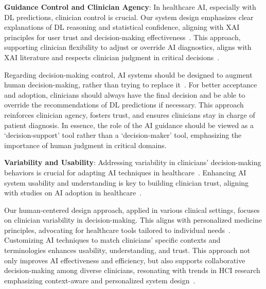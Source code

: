 
\noindent
\textcolor{revised}{{\bf Guidance Control and Clinician Agency}:
In healthcare \ac{AI}, especially with \ac{DL} predictions, clinician control is crucial.
Our system design emphasizes clear explanations of \ac{DL} reasoning and statistical confidence, aligning with \ac{XAI} principles for user trust and decision-making effectiveness~\cite{EVANS2022281}.
This approach, supporting clinician flexibility to adjust or override \ac{AI} diagnostics, aligns with \ac{XAI} literature and respects clinician judgment in critical decisions~\cite{10.1145/3313831.3376290}.}

\vspace{2.00mm}

\textcolor{revised}{Regarding decision-making control, \ac{AI} systems should be designed to augment human decision-making, rather than trying to replace it~\cite{SchaekermannMike2020, 10.1145/3308560.3317085}.
For better acceptance and adoption, clinicians should always have the final decision and be able to override the recommendations of \ac{DL} predictions if necessary.
This approach reinforces clinician agency, fosters trust, and ensures clinicians stay in charge of patient diagnosis.
In essence, the role of the \ac{AI} guidance should be viewed as a `decision-support' tool rather than a `decision-maker' tool, emphasizing the importance of human judgment in critical domains.}

\vspace{2.00mm}

\noindent
\textcolor{revised}{{\bf Variability and Usability}:
Addressing variability in clinicians' decision-making behaviors is crucial for adapting \ac{AI} techniques in healthcare~\cite{GIBSON2018113}.
Enhancing \ac{AI} system usability and understanding is key to building clinician trust, aligning with studies on \ac{AI} adoption in healthcare~\cite{Topol2019}.}

\vspace{2.00mm}

\textcolor{revised}{Our human-centered design approach, applied in various clinical settings, focuses on clinician variability in decision-making.
This aligns with personalized medicine principles, advocating for healthcare tools tailored to individual needs~\cite{Tschandl2020}.
Customizing \ac{AI} techniques to match clinicians' specific contexts and terminologies enhances usability, understanding, and trust.
This approach not only improves \ac{AI} effectiveness and efficiency, but also supports collaborative decision-making among diverse clinicians, resonating with trends in \ac{HCI} research emphasizing context-aware and personalized system design~\cite{10.1145/3173574.3174156}.}

